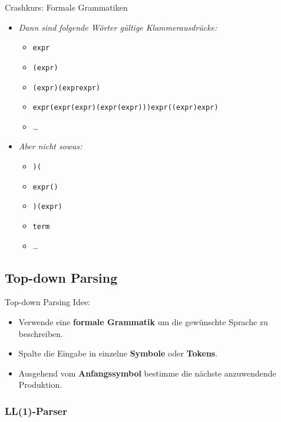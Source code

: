 \documentclass[18pt]{beamer}
\begin{document}
\begin{frame}{Crashkurs: Formale Grammatiken}
    \begin{itemize}
        \item \textit{Dann sind folgende Wörter gültige Klammerausdrücke:}
        \begin{itemize}
            \item \texttt{expr}
            \item \texttt{(expr)}
            \item \texttt{(expr)(exprexpr)}
            \item \texttt{expr(expr(expr)(expr(expr)))expr((expr)expr)}
            \item \dots
        \end{itemize}
        \item \textit{Aber nicht sowas:}
        \begin{itemize}
            \item \texttt{)(}
            \item \texttt{expr()}
            \item \texttt{)(expr)}
            \item \texttt{term}
            \item \dots
        \end{itemize}
    \end{itemize}
\end{frame}

\subsection{Top-down Parsing}

\begin{frame}{Top-down Parsing}
    Idee:\\
    \begin{itemize}
        \item Verwende eine \textbf{formale Grammatik} um die gewünschte Sprache zu beschreiben.
        \item Spalte die Eingabe in einzelne \textbf{Symbole} oder \textbf{Tokens}.
        \item Ausgehend vom \textbf{Anfangssymbol} bestimme die nächste anzuwendende Produktion.
    \end{itemize}
\end{frame}

\subsubsection{LL(1)-Parser}
\end{document}

